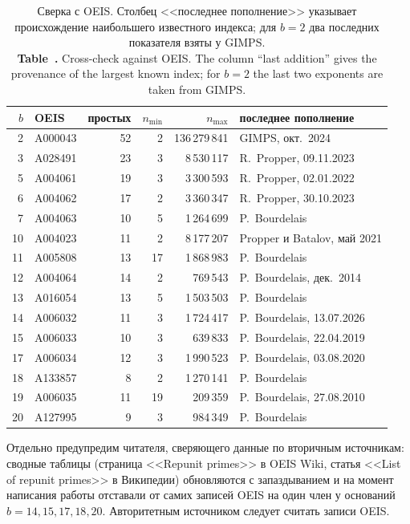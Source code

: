 \documentclass[11pt,a4paper]{article}
\newcommand{\encaptab}[1]{\\[3pt]\foreignlanguage{english}{%
  \textbf{Table~\thetable.} #1}}
\theoremstyle{plain}
\theoremstyle{remark}
\begin{document}
\begin{table}[h]
\centering
\caption{Сверка с OEIS. Столбец <<последнее пополнение>> указывает происхождение
наибольшего известного индекса; для $b=2$ два последних показателя взяты у GIMPS.
\encaptab{Cross-check against OEIS. The column ``last addition'' gives the
provenance of the largest known index; for $b=2$ the last two exponents are taken
from GIMPS.}}
\label{tab:verify}
\small
\begin{tabular}{rlrrrl}
\toprule
$b$ & OEIS & простых & $n_{\min}$ & $n_{\max}$ & последнее пополнение\\
\midrule
2 & A000043 & 52 & 2 & 136\,279\,841 & GIMPS, окт.\ 2024\\
3 & A028491 & 23 & 3 & 8\,530\,117 & R.~Propper, 09.11.2023\\
5 & A004061 & 19 & 3 & 3\,300\,593 & R.~Propper, 02.01.2022\\
6 & A004062 & 17 & 2 & 3\,360\,347 & R.~Propper, 30.10.2023\\
7 & A004063 & 10 & 5 & 1\,264\,699 & P.~Bourdelais\\
10 & A004023 & 11 & 2 & 8\,177\,207 & Propper и Batalov, май 2021\\
11 & A005808 & 13 & 17 & 1\,868\,983 & P.~Bourdelais\\
12 & A004064 & 14 & 2 & 769\,543 & P.~Bourdelais, дек.\ 2014\\
13 & A016054 & 13 & 5 & 1\,503\,503 & P.~Bourdelais\\
14 & A006032 & 11 & 3 & 1\,724\,417 & P.~Bourdelais, 13.07.2026\\
15 & A006033 & 10 & 3 & 639\,833 & P.~Bourdelais, 22.04.2019\\
17 & A006034 & 12 & 3 & 1\,990\,523 & P.~Bourdelais, 03.08.2020\\
18 & A133857 & 8 & 2 & 1\,270\,141 & P.~Bourdelais\\
19 & A006035 & 11 & 19 & 209\,359 & P.~Bourdelais, 27.08.2010\\
20 & A127995 & 9 & 3 & 984\,349 & P.~Bourdelais\\
\bottomrule
\end{tabular}
\end{table}

Отдельно предупредим читателя, сверяющего данные по вторичным источникам: сводные
таблицы (страница <<Repunit primes>> в OEIS Wiki, статья <<List of repunit primes>>
в Википедии) обновляются с запаздыванием и на момент написания работы отставали
от самих записей OEIS на один член у оснований $b=14,15,17,18,20$. Авторитетным
источником следует считать записи OEIS.
\end{document}
